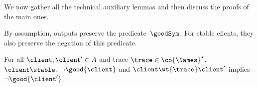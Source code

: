


\label{completeness-part-2.2-auxiliary-proof}
\label{sec:appendix-completeness}

  We now gather all the technical auxiliary lemmas and then discuss the
  proofs of the main ones.

By assumption, outputs preserve the predicate~$\goodSym$.
For
stable clients, they also preserve the negation of this predicate.
\begin{lemma}%
    \label{lem:st-wtout-Nok}
  For all $\client, \client' \in \States$ and trace $\trace \in \co{\Names}^\star$,
  $\client \stable$, $\lnot \good{\client}$ and $\client \wt{ \trace }
  \client'$ implies $\lnot \good{\client'} $.
\end{lemma}





